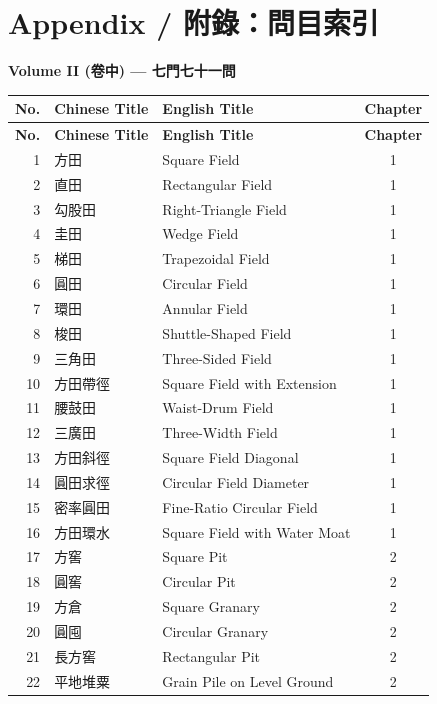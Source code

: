\documentclass[11pt,a4paper]{article}
\begin{document}
\section*{Appendix / 附錄：問目索引}

\begin{center}
\textbf{Volume II (卷中) --- 七門七十一問}

\vspace{0.3cm}
\begin{longtable}{|r|l|l|c|}
\hline
\textbf{No.} & \textbf{Chinese Title} & \textbf{English Title} & \textbf{Chapter} \\
\hline
\endfirsthead
\hline
\textbf{No.} & \textbf{Chinese Title} & \textbf{English Title} & \textbf{Chapter} \\
\hline
\endhead
1 & 方田 & Square Field & 1 \\
2 & 直田 & Rectangular Field & 1 \\
3 & 勾股田 & Right-Triangle Field & 1 \\
4 & 圭田 & Wedge Field & 1 \\
5 & 梯田 & Trapezoidal Field & 1 \\
6 & 圓田 & Circular Field & 1 \\
7 & 環田 & Annular Field & 1 \\
8 & 梭田 & Shuttle-Shaped Field & 1 \\
9 & 三角田 & Three-Sided Field & 1 \\
10 & 方田帶徑 & Square Field with Extension & 1 \\
11 & 腰鼓田 & Waist-Drum Field & 1 \\
12 & 三廣田 & Three-Width Field & 1 \\
13 & 方田斜徑 & Square Field Diagonal & 1 \\
14 & 圓田求徑 & Circular Field Diameter & 1 \\
15 & 密率圓田 & Fine-Ratio Circular Field & 1 \\
16 & 方田環水 & Square Field with Water Moat & 1 \\
\hline
17 & 方窖 & Square Pit & 2 \\
18 & 圓窖 & Circular Pit & 2 \\
19 & 方倉 & Square Granary & 2 \\
20 & 圓囤 & Circular Granary & 2 \\
21 & 長方窖 & Rectangular Pit & 2 \\
22 & 平地堆粟 & Grain Pile on Level Ground & 2 \\

\end{longtable}
\end{center}
\end{document}
